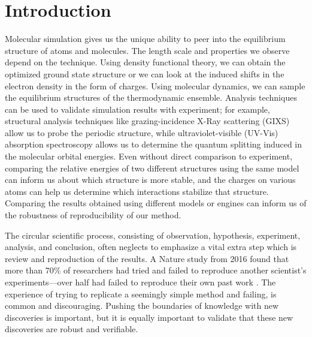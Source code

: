 \chapter{Introduction}

Molecular simulation gives us the unique ability to peer into the equilibrium structure of atoms and molecules.
The length scale and properties we observe depend on the technique.
Using density functional theory, we can obtain the optimized ground state structure or we can look at the induced shifts in the electron density in the form of charges.
Using molecular dynamics, we can sample the equilibrium structures of the thermodynamic ensemble. 
Analysis techniques can be used to validate simulation results with experiment; for example, structural analysis techniques like grazing-incidence X-Ray scattering (GIXS) allow us to probe the periodic structure, while ultraviolet-visible (UV-Vis) absorption spectroscopy allows us to determine the quantum splitting induced in the molecular orbital energies.
Even without direct comparison to experiment, comparing the relative energies of two different structures using the same model can inform us about which structure is more stable, and the charges on various atoms can help us determine which interactions stabilize that structure.
Comparing the results obtained using different models or engines can inform us of the robustness of reproducibility of our method.

The circular scientific process, consisting of observation, hypothesis, experiment, analysis, and conclusion, often neglects to emphasize a vital extra step which is review and reproduction of the results. 
A Nature study from 2016 found that more than 70\% of researchers had tried and failed to reproduce another scientist’s experiments---over half had failed to reproduce their own past work \cite{Baker2016}.
The experience of trying to replicate a seemingly simple method and failing, is common and discouraging.
Pushing the boundaries of knowledge with new discoveries is important, but it is equally important to validate that these new discoveries are robust and verifiable.

